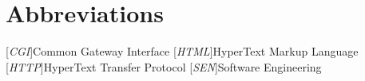 
\chapter{Abbreviations}
	\begin{acronym}
		\setlength{\itemsep}{-\parsep}
		[\textsl{CGI}]{Common Gateway Interface}
		[\textsl{HTML}]{HyperText Markup Language}
		[\textsl{HTTP}]{HyperText Transfer Protocol}
		[\textit{SEN}]{Software Engineering}
	\end{acronym}